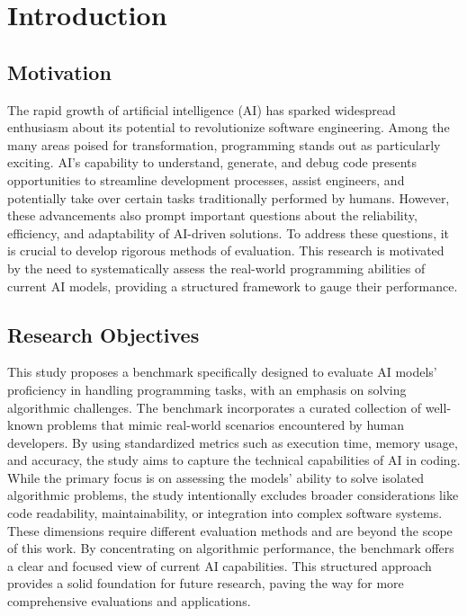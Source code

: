 \section{Introduction}

\subsection{Motivation}
The rapid growth of artificial intelligence (AI) has sparked widespread enthusiasm about its potential to revolutionize software engineering. Among the many areas poised for transformation, programming stands out as particularly exciting. AI’s capability to understand, generate, and debug code presents opportunities to streamline development processes, assist engineers, and potentially take over certain tasks traditionally performed by humans. However, these advancements also prompt important questions about the reliability, efficiency, and adaptability of AI-driven solutions. To address these questions, it is crucial to develop rigorous methods of evaluation. This research is motivated by the need to systematically assess the real-world programming abilities of current AI models, providing a structured framework to gauge their performance.
\subsection{Research Objectives}
This study proposes a benchmark specifically designed to evaluate AI models' proficiency in handling programming tasks, with an emphasis on solving algorithmic challenges. The benchmark incorporates a curated collection of well-known problems that mimic real-world scenarios encountered by human developers. By using standardized metrics such as execution time, memory usage, and accuracy, the study aims to capture the technical capabilities of AI in coding. While the primary focus is on assessing the models’ ability to solve isolated algorithmic problems, the study intentionally excludes broader considerations like code readability, maintainability, or integration into complex software systems. These dimensions require different evaluation methods and are beyond the scope of this work. By concentrating on algorithmic performance, the benchmark offers a clear and focused view of current AI capabilities. This structured approach provides a solid foundation for future research, paving the way for more comprehensive evaluations and applications.
